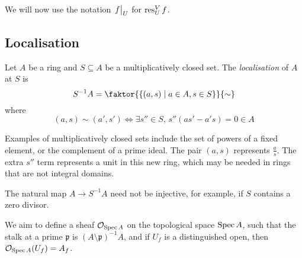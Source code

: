We will now use the notation \( \eval{f}_U \) for \( \operatorname{res}^V_U f \).

\subsection{Localisation}
\begin{definition}
    Let \( A \) be a ring and \( S \subseteq A \) be a multiplicatively closed set.
    The \emph{localisation} of \( A \) at \( S \) is
    \[ S^{-1}A = \faktor{\qty{(a, s) \mid a \in A, s \in S}}{\sim} \]
    where
    \[ (a, s) \sim (a', s') \iff \exists s'' \in S,\, s''(as' - a's) = 0 \in A \]
\end{definition}
Examples of multiplicatively closed sets include the set of powers of a fixed element, or the complement of a prime ideal.
The pair \( (a, s) \) represents \( \frac{a}{s} \).
The extra \( s'' \) term represents a unit in this new ring, which may be needed in rings that are not integral domains.
\begin{remark}
    The natural map \( A \to S^{-1} A \) need not be injective, for example, if \( S \) contains a zero divisor.
\end{remark}
We aim to define a sheaf \( \mathcal O_{\operatorname{Spec} A} \) on the topological space \( \operatorname{Spec} A \), such that the stalk at a prime \( \mathfrak p \) is \( (A \setminus \mathfrak p)^{-1} A \), and if \( U_f \) is a distinguished open, then \( \mathcal O_{\operatorname{Spec} A}(U_f) = A_f \).

